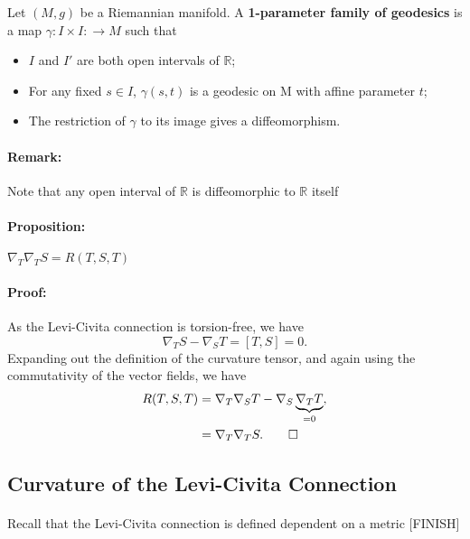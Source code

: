 \documentclass[11pt,fleqn]{report}
\begin{document}
\begin{definition}
	Let $(M,g)$ be a Riemannian manifold. A \textbf{1-parameter family of geodesics} is a map $\gamma: I \times I: \longrightarrow M$ such that
		\begin{itemize}
			\item $I$ and $I'$ are both open intervals of $\mathbb{R}$;
			\item For any fixed $s \in I$, $\gamma(s,t)$ is a geodesic on M with affine parameter $t$;
			\item The restriction of $\gamma$ to its image gives a diffeomorphism.
		\end{itemize}
\end{definition}

\paragraph{Remark:} Note that any open interval of $\mathbb{R}$ is diffeomorphic to $\mathbb{R}$ itself 

\paragraph{Proposition:} $\nabla_T \nabla_T S = R(T,S,T)$

\paragraph{Proof:} As the Levi-Civita connection is torsion-free, we have
	\begin{equation}
		\nabla_T S - \nabla_S T = [T,S] = 0.
	\end{equation}
Expanding out the definition of the curvature tensor, and again using the commutativity of the vector fields, we have
	\begin{align}
		R(T,S,T) &= \nabla_T \nabla_S T - \nabla_S \underbrace{\nabla_T T}_{=0},\\
						&= \nabla_T \nabla_T S. \qed
	\end{align}

\subsection{Curvature of the Levi-Civita Connection}

\paragraph{} Recall that the Levi-Civita connection is defined dependent on a metric [FINISH]
\end{document}
